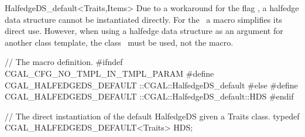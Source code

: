\begin{ccRefClass}{HalfedgeDS_default<Traits,Items>}
Due to a workaround for the flag ,
a halfedge data structure cannot be instantiated directly. For the
\ccRefName\ a macro simplifies its direct use. However, when using a
halfedge data structure as an argument for another class template,
the class \ccRefName\ must be used, not the macro.

\begin{ccExampleCode}
// The macro definition.
#ifndef CGAL_CFG_NO_TMPL_IN_TMPL_PARAM
    #define CGAL_HALFEDGEDS_DEFAULT  ::CGAL::HalfedgeDS_default
#else
    #define CGAL_HALFEDGEDS_DEFAULT  ::CGAL::HalfedgeDS_default::HDS
#endif

// The direct instantiation of the default HalfedgeDS given a Traits class.
typedef CGAL_HALFEDGEDS_DEFAULT<Traits> HDS;
\end{ccExampleCode}

\end{ccRefClass}

\ccRefPageEnd

